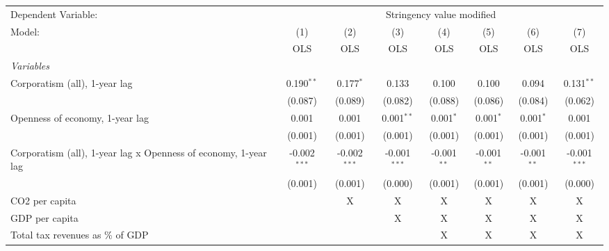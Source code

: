 
\begingroup
\centering
\begin{tabular}{lccccccc}
   \toprule
   Dependent Variable: & \multicolumn{7}{c}{Stringency value modified}\\
   Model:                                                          & (1)            & (2)            & (3)            & (4)           & (5)           & (6)           & (7)\\  
                                                                   &  OLS           & OLS            & OLS            & OLS           & OLS           & OLS           & OLS\\  
   \midrule
   \emph{Variables}\\
   Corporatism (all), 1-year lag                                   & 0.190$^{**}$   & 0.177$^{*}$    & 0.133          & 0.100         & 0.100         & 0.094         & 0.131$^{**}$\\   
                                                                   & (0.087)        & (0.089)        & (0.082)        & (0.088)       & (0.086)       & (0.084)       & (0.062)\\   
   Openness of economy, 1-year lag                                 & 0.001          & 0.001          & 0.001$^{**}$   & 0.001$^{*}$   & 0.001$^{*}$   & 0.001$^{*}$   & 0.001\\   
                                                                   & (0.001)        & (0.001)        & (0.001)        & (0.001)       & (0.001)       & (0.001)       & (0.001)\\   
   Corporatism (all), 1-year lag x Openness of economy, 1-year lag & -0.002$^{***}$ & -0.002$^{***}$ & -0.001$^{***}$ & -0.001$^{**}$ & -0.001$^{**}$ & -0.001$^{**}$ & -0.001$^{***}$\\   
                                                                   & (0.001)        & (0.001)        & (0.000)        & (0.001)       & (0.001)       & (0.001)       & (0.000)\\   
   CO2 per capita                                                  &                & X              & X              & X             & X             & X             & X\\  
   GDP per capita                                                  &                &                & X              & X             & X             & X             & X\\  
   Total tax revenues as \% of GDP                                 &                &                &                & X             & X             & X             & X\\  

\end{tabular}
